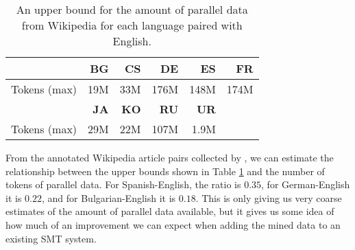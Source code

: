 \begin{table}
\begin{center}
\begin{tabular}{|r||r|r|r|r|r|}
\hline
& \textbf{BG} & \textbf{CS} & \textbf{DE} & \textbf{ES} & \textbf{FR} \\
\hline
Tokens (max)  & 19M  & 33M  & 176M & 148M & 174M  \\
\hline
\hline
& \textbf{JA} & \textbf{KO} & \textbf{RU} & \textbf{UR} &\\
\hline
Tokens (max)  & 29M & 22M & 107M & 1.9M & \\
\hline
\end{tabular}
\end{center}
\caption{An upper bound for the amount of parallel data from Wikipedia for each
language paired with English.}
\label{tab:wiki_data}
\end{table}

From the annotated Wikipedia article pairs collected by \citet{Smith10}, we can
estimate the relationship between the upper bounds shown in Table
\ref{tab:wiki_data} and the number of tokens of parallel data. For
Spanish-English, the ratio is $0.35$, for German-English it is $0.22$, and for
Bulgarian-English it is $0.18$. This is only giving us very coarse estimates of
the amount of parallel data available, but it gives us some idea of how much
of an improvement we can expect when adding the mined data to an existing SMT
system.
